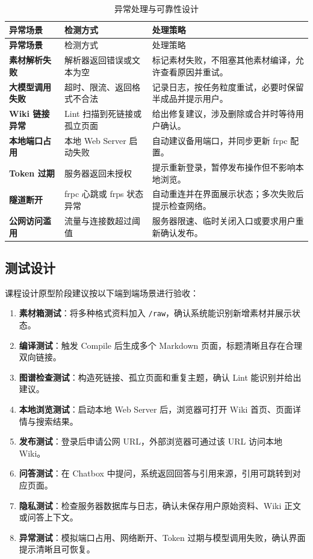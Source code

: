 \documentclass[UTF8,a4paper,12pt]{ctexart}
\newcommand{\keypoint}[1]{\textcolor{whu}{\textbf{#1}}}
\newcommand{\code}[1]{\texttt{#1}}
\begin{document}
\begin{longtable}{>{\bfseries}p{3.3cm}p{4.8cm}p{5.7cm}}
  \caption{异常处理与可靠性设计}\label{tab:exception}\\
  \toprule
  异常场景 & 检测方式 & 处理策略 \\
  \midrule\endfirsthead
  \toprule
  异常场景 & 检测方式 & 处理策略 \\
  \midrule\endhead
  素材解析失败   & 解析器返回错误或文本为空       & 标记素材失败，不阻塞其他素材编译，允许查看原因并重试。\\
  大模型调用失败 & 超时、限流、返回格式不合法     & 记录日志，按任务粒度重试，必要时保留半成品并提示用户。\\
  Wiki 链接异常  & Lint 扫描到死链接或孤立页面    & 给出修复建议，涉及删除或合并时等待用户确认。\\
  本地端口占用   & 本地 Web Server 启动失败       & 自动建议备用端口，并同步更新 frpc 配置。\\
  Token 过期     & 服务器返回未授权               & 提示重新登录，暂停发布操作但不影响本地浏览。\\
  隧道断开       & frpc 心跳或 frps 状态异常      & 自动重连并在界面展示状态；多次失败后提示检查网络。\\
  公网访问滥用   & 流量与连接数超过阈值           & 服务器限速、临时关闭入口或要求用户重新确认发布。\\
  \bottomrule
\end{longtable}

\subsection{测试设计}
课程设计原型阶段建议按以下端到端场景进行验收：
\begin{enumerate}[leftmargin=2.4em, itemsep=1pt]
  \item \keypoint{素材箱测试}：将多种格式资料加入 \code{/raw}，确认系统能识别新增素材并展示状态。
  \item \keypoint{编译测试}：触发 Compile 后生成多个 Markdown 页面，标题清晰且存在合理双向链接。
  \item \keypoint{图谱检查测试}：构造死链接、孤立页面和重复主题，确认 Lint 能识别并给出建议。
  \item \keypoint{本地浏览测试}：启动本地 Web Server 后，浏览器可打开 Wiki 首页、页面详情与搜索结果。
  \item \keypoint{发布测试}：登录后申请公网 URL，外部浏览器可通过该 URL 访问本地 Wiki。
  \item \keypoint{问答测试}：在 Chatbox 中提问，系统返回回答与引用来源，引用可跳转到对应页面。
  \item \keypoint{隐私测试}：检查服务器数据库与日志，确认未保存用户原始资料、Wiki 正文或问答上下文。
  \item \keypoint{异常测试}：模拟端口占用、网络断开、Token 过期与模型调用失败，确认界面提示清晰且可恢复。
\end{enumerate}
\end{document}
